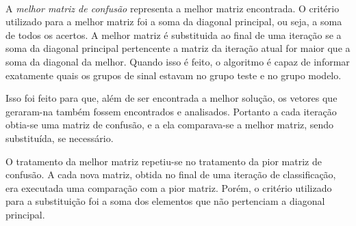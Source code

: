 \documentclass[a4paper,12pt,oneside]{report}
\begin{document}
\\
\par A \emph{melhor matriz de confus\~{a}o} representa a melhor matriz encontrada. O crit\'{e}rio utilizado para a melhor matriz foi a soma da diagonal principal, ou seja, a soma de todos os acertos. A melhor matriz \'{e} substituida ao final de uma itera\c{c}\~{a}o se a soma da diagonal principal pertencente a matriz da itera\c{c}\~{a}o atual for maior que a soma da diagonal da melhor. Quando isso \'{e} feito, o algoritmo \'{e} capaz de informar exatamente quais os grupos de sinal estavam no grupo teste e no grupo modelo. 
\\
\par Isso foi feito para que, al\'{e}m de ser encontrada a melhor solu\c{c}\~{a}o, os vetores que geraram-na tamb\'{e}m fossem encontrados e analisados. Portanto a cada itera\c{c}\~{a}o obtia-se uma matriz de confus\~{a}o, e a ela comparava-se a melhor matriz, sendo substitu\'{i}da, se necess\'{a}rio. 
\\
\par O tratamento da melhor matriz repetiu-se no tratamento da pior matriz de confus\~{a}o. A cada nova matriz, obtida no final de uma itera\c{c}\~{a}o de classifica\c{c}\~{a}o, era executada uma compara\c{c}\~{a}o com a pior matriz. Por\'{e}m, o crit\'{e}rio utilizado para a substitui\c{c}\~{a}o foi a soma dos elementos que n\~{a}o pertenciam a diagonal principal. 
\end{document}

